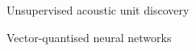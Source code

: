 \documentclass[final]{beamer}
\newcommand{\nonparallel}[1]{\textcolor{tablue20orange}{#1}}
\newcommand{\zeroshot}[1]{\textcolor{tablue20blue}{#1}}
\newcommand{\realtime}[1]{\textcolor{tablue20red}{#1}}
\newcommand{\highqual}[1]{\textcolor{tablue20green}{#1}}
\newcommand{\mybf}[1]{\textcolor{darkestgray}{\textbf{#1}}}
\begin{document}
\begin{frame}[t]
\begin{columns}[T]
\begin{column}{.33\linewidth}
\begin{minipage}[T]{.97\textwidth}
{\begin{block}{Unsupervised acoustic unit discovery}
        
        
\end{block}




\begin{block}{Vector-quantised neural networks}

        
        
    


\end{block}}
\end{minipage}
\end{column}
\end{columns}
\end{frame}
\end{document}
